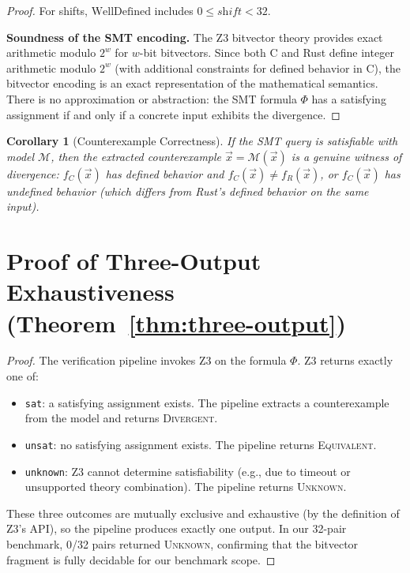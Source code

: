 \documentclass[11pt,a4paper]{article}
\newtheorem{corollary}[theorem]{Corollary}
\begin{document}
\begin{appendices}
\begin{proof}
For shifts, $\text{WellDefined}$ includes $0 \leq \textit{shift} < 32$.

\textbf{Soundness of the SMT encoding.}
The Z3 bitvector theory provides exact arithmetic modulo $2^w$ for
$w$-bit bitvectors.  Since both C and Rust define integer arithmetic
modulo $2^w$ (with additional constraints for defined behavior in C),
the bitvector encoding is an exact representation of the mathematical
semantics.  There is no approximation or abstraction: the SMT formula
$\Phi$ has a satisfying assignment if and only if a concrete input
exhibits the divergence.
\end{proof}

\begin{corollary}[Counterexample Correctness]\label{cor:cex-correct}
If the SMT query is satisfiable with model $\mathcal{M}$, then the
extracted counterexample $\vec{x} = \mathcal{M}(\vec{x})$ is a genuine
witness of divergence: $f_C(\vec{x})$ has defined behavior and
$f_C(\vec{x}) \neq f_R(\vec{x})$, \emph{or} $f_C(\vec{x})$ has
undefined behavior (which differs from Rust's defined behavior on the
same input).
\end{corollary}


\section{Proof of Three-Output Exhaustiveness (Theorem~\ref{thm:three-output})}\label{app:proof-three-output}

\begin{proof}
The verification pipeline invokes Z3 on the formula $\Phi$.  Z3 returns
exactly one of:
\begin{itemize}
  \item \texttt{sat}: a satisfying assignment exists.  The pipeline
    extracts a counterexample from the model and returns \textsc{Divergent}.
  \item \texttt{unsat}: no satisfying assignment exists.  The pipeline
    returns \textsc{Equivalent}.
  \item \texttt{unknown}: Z3 cannot determine satisfiability (e.g., due to
    timeout or unsupported theory combination).  The pipeline returns
    \textsc{Unknown}.
\end{itemize}
These three outcomes are mutually exclusive and exhaustive (by the
definition of Z3's API), so the pipeline produces exactly one output.
In our 32-pair benchmark, 0/32 pairs returned \textsc{Unknown},
confirming that the bitvector fragment is fully decidable for our
benchmark scope.
\end{proof}



\end{appendices}
\end{document}
